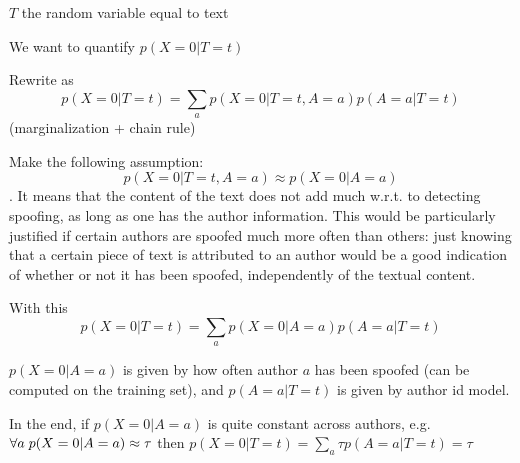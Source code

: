 \documentclass{Interspeech}
\begin{document}
$T$ the random variable equal to text

We want to quantify $p(X=0|T=t)$

Rewrite as $${p(X=0|T=t) = \sum_a p(X=0|T=t,A=a)p(A=a|T=t)}$$ (marginalization
+ chain rule)

Make the following assumption: $$p(X=0|T=t,A=a) \approx p(X=0|A=a)$$. It means
that the content of the text does not add much w.r.t. to detecting spoofing, as
long as one has the author information. This would be particularly justified if
certain authors are spoofed much more often than others: just knowing that a
certain piece of text is attributed to an author would be a good indication of
whether or not it has been spoofed, independently of the textual content.

With this $${p(X=0|T=t) = \sum_a p(X=0|A=a)p(A=a|T=t)}$$

${p(X=0|A=a)}$ is given by how often author $a$ has been spoofed (can be computed on the training set), and ${p(A=a|T=t)}$ is given by author id model.

In the end, if $p(X=0|A=a)$ is quite constant across authors, e.g. ${\forall a
            \thickspace p(X=0|A=a) \approx \tau}$ then ${p(X=0|T=t) = \sum_a \tau
            p(A=a|T=t) = \tau}$
\end{document}
